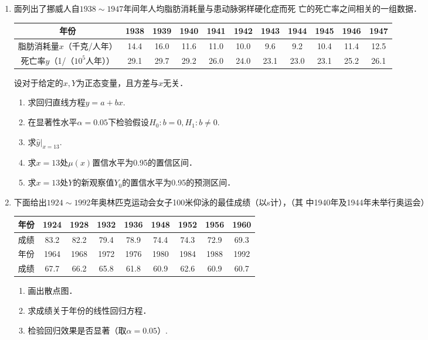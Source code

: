 \documentclass[10pt,a4paper]{article}
\begin{document}
\begin{enumerate}
    \item 面列出了挪威人自$1938 \sim 1947$年间年人均脂肪消耗量与患动脉粥样硬化症而死
    亡的死亡率之间相关的一组数据．
    \renewcommand{\arraystretch}{1.3}
    \begin{table}[H]\centering
        \begin{tabular}{c|c|c|c|c|c|c|c|c|c|c}
        \hline
        年份                   & 1938 & 1939 & 1940 & 1941 & 1942 & 1943 & 1944 & 1945 & 1946 & 1947 \\ \hline
        脂肪消耗量$x$（千克/人年）      & 14.4 & 16.0 & 11.6 & 11.0 & 10.0 & 9.6  & 9.2  & 10.4 & 11.4 & 12.5 \\ \hline
        死亡率$y$（1/（$10^5$人年）） & 29.1 & 29.7 & 29.2 & 26.0 & 24.0 & 23.1 & 23.0 & 23.1 & 25.2 & 26.1 \\ \hline
        \end{tabular}
    \end{table}
    \renewcommand{\arraystretch}{1.0}
    设对于给定的$x,Y$为正态变量，且方差与$x$无关．
    \begin{enumerate}
        \item 求回归直线方程$y=a+bx$.
        \item 在显著性水平$\alpha=0.05$下检验假设$H_0:b=0,H_1:b\neq 0$.
        \item 求$\hat{y}|_{x=13}$.
        \item 求$x=13$处$\mu(x)$置信水平为0.95的置信区间．
        \item 求$x=13$处$Y$的新观察值$Y_0$的置信水平为0.95的预测区间．
    \end{enumerate}




    \item 下面给出$1924 \sim 1992$年奥林匹克运动会女子100米仰泳的最佳成绩（以s计），（其
    中1940年及1944年未举行奥运会）
    \renewcommand{\arraystretch}{1.3}
    \begin{table}[H]\centering
        \begin{tabular}{c|cccccccc}
        \hline
        年份 & 1924 & 1928 & 1932 & 1936 & 1948 & 1952 & 1956 & 1960 \\ \hline
        成绩 & 83.2 & 82.2 & 79.4 & 78.9 & 74.4 & 74.3 & 72.9 & 69.3 \\ \hline
        年份 & 1964 & 1968 & 1972 & 1976 & 1980 & 1984 & 1988 & 1992 \\ \hline
        成绩 & 67.7 & 66.2 & 65.8 & 61.8 & 60.9 & 62.6 & 60.9 & 60.7 \\ \hline
        \end{tabular}
    \end{table}
    \renewcommand{\arraystretch}{1.0}
    \begin{enumerate}
        \item 画出散点图．
        \item 求成绩关于年份的线性回归方程．
        \item 检验回归效果是否显著（取$\alpha=0.05$）.
    \end{enumerate}











  

\end{enumerate}
\end{document}
